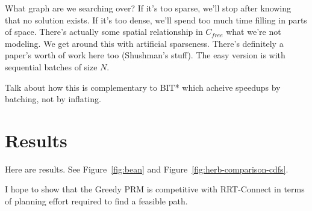 \documentclass{report}
\begin{document}
What graph are we searching over?
If it's too sparse, we'll stop after knowing that no solution exists.
If it's too dense, we'll spend too much time filling in parts of
space.
There's actually some spatial relationship in $C_{free}$ what we're not
modeling.
We get around this with artificial sparseness.
There's definitely a paper's worth of work here too (Shushman's stuff).
The easy version is with sequential batches of size $N$.

Talk about how this is complementary to BIT* which acheive speedups
by batching, not by inflating.

\section{Results}

Here are results.
See Figure~\ref{fig:bean} and Figure~\ref{fig:herb-comparison-cdfs}.

I hope to show that the Greedy PRM is competitive with RRT-Connect
in terms of planning effort required to find a feasible path.
\end{document}
